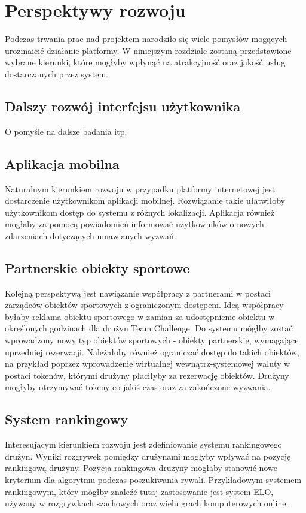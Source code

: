 \chapter{Perspektywy rozwoju}

Podczas trwania prac nad projektem narodziło się wiele pomysłów mogących urozmaicić działanie platformy. W niniejszym rozdziale zostaną przedstawione wybrane kierunki, które mogłyby wpłynąć na atrakcyjność oraz jakość usług dostarczanych przez system.

\section{Dalszy rozwój interfejsu użytkownika}

O pomyśle na dalsze badania itp.

\section{Aplikacja mobilna}

Naturalnym kierunkiem rozwoju w przypadku platformy internetowej jest dostarczenie użytkownikom aplikacji mobilnej. Rozwiązanie takie ułatwiłoby użytkownikom dostęp do systemu z różnych lokalizacji. Aplikacja również mogłaby za pomocą powiadomień informować użytkowników o nowych zdarzeniach dotyczących umawianych wyzwań.

\section{Partnerskie obiekty sportowe}

Kolejną perspektywą jest nawiązanie współpracy z partnerami w postaci zarządców obiektów sportowych z ograniczonym dostępem. Ideą współpracy byłaby reklama obiektu sportowego w zamian za udostępnienie obiektu w określonych godzinach dla drużyn Team Challenge. Do systemu mógłby zostać wprowadzony nowy typ obiektów sportowych - obiekty partnerskie, wymagające uprzedniej rezerwacji. Należałoby również ograniczać dostęp do takich obiektów, na przykład poprzez wprowadzenie wirtualnej wewnątrz-systemowej waluty w postaci tokenów, którymi drużyny płaciłyby za rezerwację obiektów. Drużyny mogłyby otrzymywać tokeny co jakiś czas oraz za zakończone wyzwania.

\section{System rankingowy}

Interesującym kierunkiem rozwoju jest zdefiniowanie systemu rankingowego drużyn. Wyniki rozgrywek pomiędzy drużynami mogłyby wpływać na pozycję rankingową drużyny. Pozycja rankingowa drużyny mogłaby stanowić nowe kryterium dla algorytmu podczas poszukiwania rywali. Przykładowym systemem rankingowym, który mógłby znaleźć tutaj zastosowanie jest system ELO, używany w rozgrywkach szachowych oraz wielu grach komputerowych online.

\begin{comment}

proponowanei spotkan przez zawodnikow
propozycje pobliskich obiektow przy negocjacjach miejsca
system notyfikacji

\end{comment}